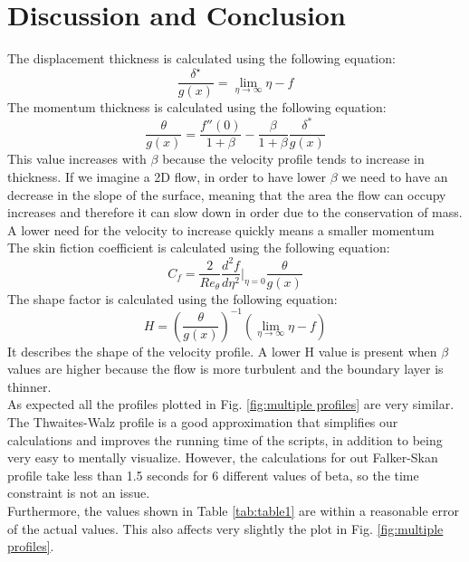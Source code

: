 \documentclass[conf]{new-aiaa}
\begin{document}
\section{Discussion and Conclusion} \label{sec:conclusion}
The displacement thickness is calculated using the following equation:
\begin{equation}
   \frac{\delta^\star}{g(x)}=\lim_{\eta \to \infty} \eta -f
\end{equation}
The momentum thickness is calculated using the following equation:
\begin{equation}
    \frac{\theta}{g(x)} = \frac{f''(0)}{1+\beta}-\frac{\beta}{1+\beta}\frac{\delta^*}{g(x)}
\end{equation}
This value increases with $\beta$ because the velocity profile tends to increase in thickness. If we imagine a 2D flow, in order to have lower $\beta$ we need to have an decrease in the slope of the surface, meaning that the area the flow can occupy increases  and therefore it can slow down in order due to the conservation of mass. 
A lower need for the velocity to increase quickly means a smaller momentum \\
The skin fiction coefficient is calculated using the following equation:
\begin{equation}
    C_f=\frac{2}{Re_{\theta}}\frac{d^2f}{d\eta^2}\Big|_{\eta=0}\frac{\theta}{g(x)}
\end{equation}
The shape factor is calculated using the following equation:
\begin{equation}
    H=\left(\frac{\theta}{g(x)}\right)^{-1} \left(\lim_{\eta \to \infty} \eta-f\right)
\end{equation}
It describes the shape of the velocity profile. A lower H value is present when $\beta$ values are higher because the flow is more turbulent and the boundary layer is thinner. \\
As expected all the profiles plotted in Fig. \ref{fig:multiple profiles} are very similar. The Thwaites-Walz profile is a good approximation that simplifies our calculations and improves the running time of the scripts, in addition to being very easy to mentally visualize. 
However, the calculations for out Falker-Skan profile take less than 1.5 seconds for 6 different values of beta, so the time constraint is not an issue. \\
Furthermore, the values shown in Table \ref{tab:table1} are within a reasonable error of the actual values. This also affects very slightly the plot in Fig. \ref{fig:multiple profiles}. \\
\end{document}
